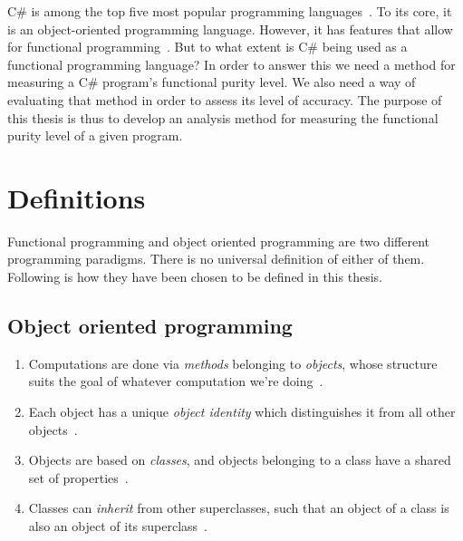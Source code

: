 \documentclass[a4paper,12pt]{article}
\begin{document}
C\# is among the top five most popular programming languages~\cite{tiobe}. To its core, it is an object-oriented programming language. However, it has features that allow for functional programming~\cite{hamid-mosalla}. But to what extent is C\# being used as a functional programming language?
In order to answer this we need a method for measuring a C\# program's functional purity level. We also need a way of evaluating that method in order to assess its level of accuracy.
The purpose of this thesis is thus to develop an analysis method for measuring the functional purity level of a given program.


\section{Definitions} \label{sub:definitions}

Functional programming and object oriented programming are two different programming paradigms. There is no universal definition of either of them. Following is how they have been chosen to be defined in this thesis.

\subsection{Object oriented programming} \label{ssub:object-oriented-programming} %

\begin{enumerate}
\item Computations are done via \textit{methods} belonging to \textit{objects}, whose structure suits the goal of whatever computation we're doing~\cite{john-m-chambers}.
\item Each object has a unique \textit{object identity} which distinguishes it from all other objects~\cite{khoshafian1986object}.
\item Objects are based on \emph{classes}, and objects belonging to a class have a shared set of properties~\cite{john-m-chambers}.
\item Classes can \emph{inherit} from other superclasses, such that an object of a class is also an object of its superclass~\cite{john-m-chambers}.
\end{enumerate}
\end{document}
